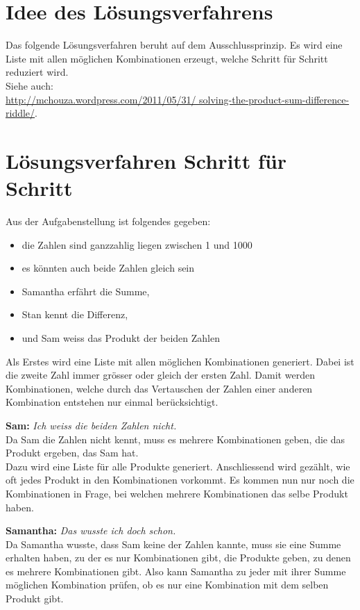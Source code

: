 \documentclass[a4paper, 10pt, fleqn]{article}
\begin{document}
\newpage

\section{Idee des Lösungsverfahrens}
Das folgende Lösungsverfahren beruht auf dem Ausschlussprinzip. Es wird eine 
Liste mit allen möglichen Kombinationen erzeugt, welche Schritt für Schritt 
reduziert wird. \\
Siehe auch: \\
\url{http://mchouza.wordpress.com/2011/05/31/
solving-the-product-sum-difference-riddle/}. 

\section{Lösungsverfahren Schritt für Schritt}
Aus der Aufgabenstellung ist folgendes gegeben: 
\begin{itemize}
\item die Zahlen sind ganzzahlig liegen zwischen 1 und 1000
\item es könnten auch beide Zahlen gleich sein
\item Samantha erfährt die Summe,
\item Stan kennt die Differenz,
\item und Sam weiss das Produkt der beiden Zahlen
\end{itemize}

Als Erstes wird eine Liste mit allen möglichen Kombinationen generiert. Dabei 
ist die zweite Zahl immer grösser oder gleich der ersten Zahl. Damit werden 
Kombinationen, welche durch das Vertauschen der Zahlen einer anderen 
Kombination entstehen nur einmal berücksichtigt. 


\textbf{Sam: }\emph{Ich weiss die beiden Zahlen nicht. } \\
Da Sam die Zahlen nicht kennt, muss es mehrere Kombinationen geben, die das 
Produkt ergeben, das Sam hat. \\
Dazu wird eine Liste für alle Produkte generiert. Anschliessend wird gezählt, 
wie oft jedes Produkt in den Kombinationen vorkommt. Es kommen nun nur noch die 
Kombinationen in Frage, bei welchen mehrere Kombinationen das selbe Produkt 
haben. 


\textbf{Samantha: }\emph{Das wusste ich doch schon. } \\
Da Samantha wusste, dass Sam keine der Zahlen kannte, muss sie eine Summe 
erhalten haben, zu der es nur Kombinationen gibt, die Produkte geben, zu denen 
es mehrere Kombinationen gibt. Also kann Samantha zu jeder mit ihrer Summe 
möglichen Kombination prüfen, ob es nur eine Kombination mit dem selben Produkt 
gibt. 

\end{document}
